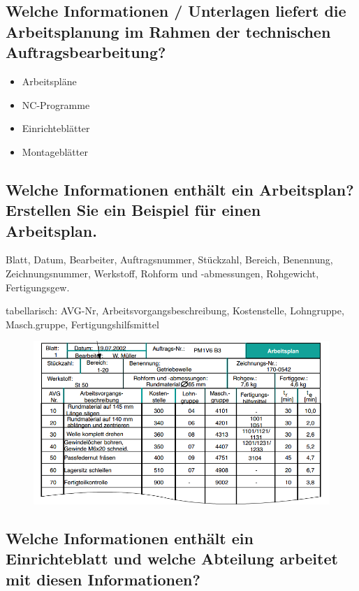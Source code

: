 \subsection*{%
    Welche Informationen / Unterlagen liefert die Arbeitsplanung im Rahmen der
    technischen Auftragsbearbeitung?
}

\begin{itemize}
    \item Arbeitspläne
    \item NC-Programme
    \item Einrichteblätter
    \item Montageblätter
\end{itemize}

\subsection*{
    Welche Informationen enthält ein Arbeitsplan? Erstellen Sie ein Beispiel
    für einen Arbeitsplan.
}

Blatt, Datum, Bearbeiter, Auftragsnummer, Stückzahl, Bereich, Benennung,
Zeichnungsnummer, Werkstoff, Rohform und -abmessungen, Rohgewicht,
Fertigungsgew.

tabellarisch: AVG-Nr, Arbeitsvorgangsbeschreibung, Kostenstelle, Lohngruppe,
Masch.gruppe, Fertigungshilfsmittel

\begin{figure}[h]
    \centering
    \includegraphics[scale=0.7]{Bild2_3.png}
\end{figure}

\subsection*{%
    Welche Informationen enthält ein Einrichteblatt und welche Abteilung
    arbeitet mit diesen Informationen?
}


